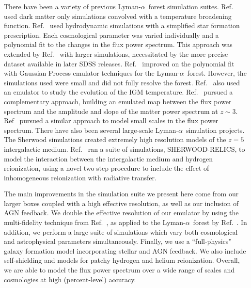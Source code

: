 \documentclass[a4paper,11pt]{article}
\newcommand{\Lya}{Lyman-$\alpha$}
\begin{document}
There have been a variety of previous \Lya~forest simulation suites. Ref.~\cite{McDonald:2005pk} used dark matter only simulations convolved with a temperature broadening function. Ref.~\cite{Viel:2006} used hydrodynamic simulations with a simplified star formation prescription. Each cosmological parameter was varied individually and a polynomial fit to the changes in the flux power spectrum. This approach was extended by Ref.~\cite{Borde:2014, Rossi:2020} with larger simulations, necessitated by the more precise dataset available in later SDSS releases. Ref.~\cite{Bird:2019} improved on the polynomial fit with Gaussian Process emulator techniques for the \Lya~forest. However, the simulations used were small and did not fully resolve the forest. Ref.~\cite{Walther:2019} also used an emulator to study the evolution of the IGM temperature. Ref.~\cite{Pedersen:2021, Pedersen:2022} pursued a complementary approach, building an emulated map between the flux power spectrum and the amplitude and slope of the matter power spectrum at $z\sim 3$. Ref~\cite{Esposito:2022} pursued a similar approach to model small scales in the flux power spectrum. There have also been several large-scale \Lya~simulation projects. The Sherwood simulations \cite{Bolton:2017} created extremely high resolution models of the $z=5$ intergalactic medium. Ref.~\cite{Puchwein:2022} ran a suite of simulations, SHERWOOD-RELICS, to model the interaction between the intergalactic medium and hydrogen reionization, using a novel two-step procedure to include the effect of inhomogeneous reionization with radiative transfer.

The main improvements in the simulation suite we present here come from our larger boxes coupled with a high effective resolution, as well as our inclusion of AGN feedback. We double the effective resolution of our emulator by using the multi-fidelity technique from Ref.~\cite{Ho:2022}, as applied to the \Lya~forest by Ref.~\cite{Fernandez:2022}. In addition, we perform a large suite of simulations which vary both cosmological and astrophysical parameters simultaneously. Finally, we use a ``full-physics'' galaxy formation model incorporating stellar and AGN feedback. We also include self-shielding and models for patchy hydrogen and helium reionization. Overall, we are able to model the flux power spectrum over a wide range of scales and cosmologies at high (percent-level) accuracy.
\end{document}
